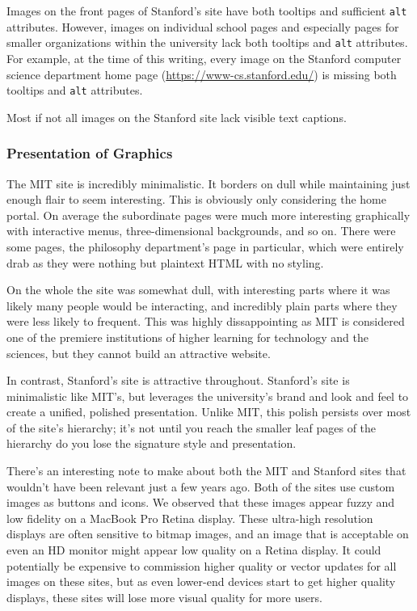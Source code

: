Images on the front pages of Stanford's site have both tooltips and sufficient
\texttt{alt} attributes. However, images on individual school pages and especially
pages for smaller organizations within the university lack both tooltips and
\texttt{alt} attributes. For example, at the time of this writing, every image
on the Stanford computer science department home page (\url{https://www-cs.stanford.edu/})
is missing both tooltips and \texttt{alt} attributes.

Most if not all images on the Stanford site lack visible text captions.

\subsubsection*{Presentation of Graphics}

The MIT site is incredibly minimalistic. It borders on dull while maintaining just enough flair
to seem interesting. This is obviously only considering the home portal. On average the
subordinate pages were much more interesting graphically with interactive menus,
three-dimensional backgrounds, and so on. There were some pages, the philosophy department's
page in particular, which were entirely drab as they were nothing but plaintext HTML with no
styling.

On the whole the site was somewhat dull, with interesting parts where it was likely many
people would be interacting, and incredibly plain parts where they were less likely to
frequent. This was highly dissappointing as MIT is considered one of the premiere
institutions of higher learning for technology and the sciences, but they cannot build an
attractive website.

In contrast, Stanford's site is attractive throughout. Stanford's site is minimalistic
like MIT's, but leverages the university's brand and look and feel to create a unified,
polished presentation. Unlike MIT, this polish persists over most of the site's
hierarchy; it's not until you reach the smaller leaf pages of the hierarchy do you
lose the signature style and presentation.

There's an interesting note to make about both the MIT and Stanford sites that wouldn't
have been relevant just a few years ago. Both of the sites use custom images as buttons
and icons. We observed that these images appear fuzzy and low fidelity on a MacBook
Pro Retina display. These ultra-high resolution displays are often sensitive to
bitmap images, and an image that is acceptable on even an HD monitor might appear
low quality on a Retina display. It could potentially be expensive to commission
higher quality or vector updates for all images on these sites, but as even lower-end
devices start to get higher quality displays, these sites will lose more visual
quality for more users.

